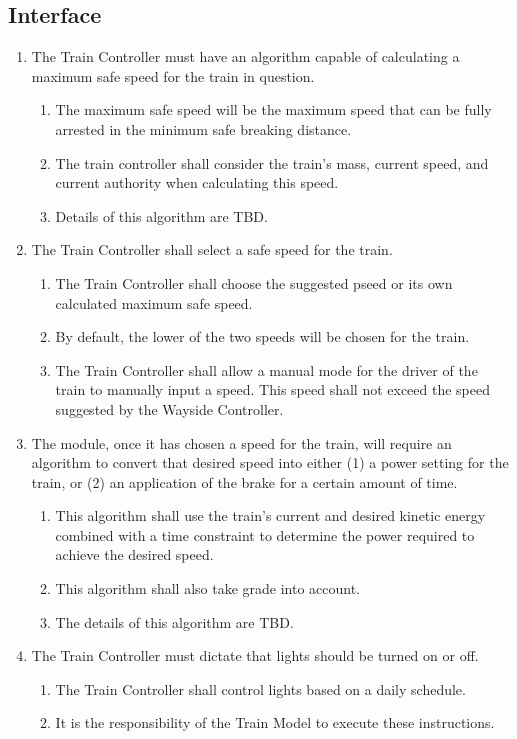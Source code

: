 \documentclass{scrreprt}
\begin{document}
\subsection{Interface}
\begin{enumerate}
\item The Train Controller must have an algorithm capable of calculating a maximum safe speed for the train in question.
	\begin{enumerate}
		\item The maximum safe speed will be the maximum speed that can be fully arrested in the minimum safe breaking distance.
		\item The train controller shall consider the train's mass, current speed, and current authority when calculating this speed.
		\item Details of this algorithm are TBD.
	\end{enumerate}

\item The Train Controller shall select a safe speed for the train.
	\begin{enumerate}
		\item The Train Controller shall choose the suggested pseed or its own calculated maximum safe speed.
		\item By default, the lower of the two speeds will be chosen for the train.
		\item The Train Controller shall allow a manual mode for the driver of the train to manually input a speed.  This speed shall not exceed the speed suggested by the Wayside Controller.
	\end{enumerate}

\item The module, once it has chosen a speed for the train, will require an algorithm to convert that desired speed into either (1) a power setting for the train, or (2) an application of the brake for a certain amount of time.
	\begin{enumerate}
		\item This algorithm shall use the train's current and desired kinetic energy combined with a time constraint to determine the power required to achieve the desired speed.
		\item This algorithm shall also take grade into account.
		\item The details of this algorithm are TBD.
	\end{enumerate}

\item The Train Controller must dictate that lights should be turned on or off.
	\begin{enumerate}
		\item The Train Controller shall control lights based on a daily schedule.
		\item It is the responsibility of the Train Model to execute these instructions.
	\end{enumerate}


\end{enumerate}
\end{document}
